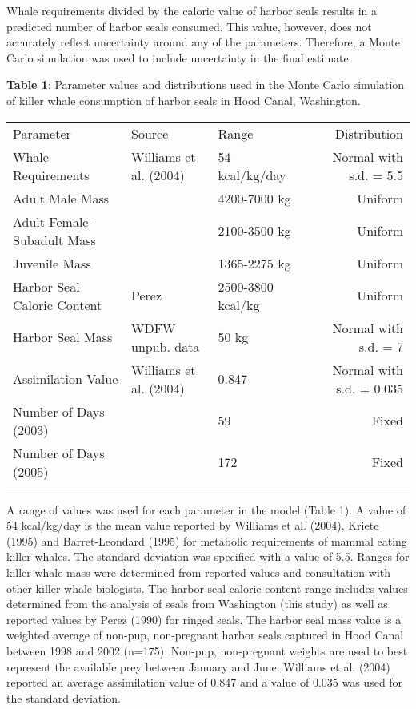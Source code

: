 Whale requirements divided by the caloric value of harbor seals results
in a predicted number of harbor seals consumed. This value, however,
does not accurately reflect uncertainty around any of the parameters.
Therefore, a Monte Carlo simulation was used to include uncertainty in
the final estimate.

\textbf{Table 1}: Parameter values and distributions used in the Monte
Carlo simulation of killer whale consumption of harbor seals in Hood
Canal, Washington.

\begin{longtable}[c]{@{}lllr@{}}
\hline\noalign{\medskip}
Parameter & Source & Range & Distribution
\\\noalign{\medskip}
\hline\noalign{\medskip}
Whale Requirements & Williams et al. (2004) & 54 kcal/kg/day & Normal
with s.d. = 5.5
\\\noalign{\medskip}
Adult Male Mass & & 4200-7000 kg & Uniform
\\\noalign{\medskip}
Adult Female-Subadult Mass & & 2100-3500 kg & Uniform
\\\noalign{\medskip}
Juvenile Mass & & 1365-2275 kg & Uniform
\\\noalign{\medskip}
Harbor Seal Caloric Content & Perez & 2500-3800 kcal/kg & Uniform
\\\noalign{\medskip}
Harbor Seal Mass & WDFW unpub. data & 50 kg & Normal with s.d. = 7
\\\noalign{\medskip}
Assimilation Value & Williams et al. (2004) & 0.847 & Normal with s.d. =
0.035
\\\noalign{\medskip}
Number of Days (2003) & & 59 & Fixed
\\\noalign{\medskip}
Number of Days (2005) & & 172 & Fixed
\\\noalign{\medskip}
\hline
\end{longtable}

A range of values was used for each parameter in the model (Table 1). A
value of 54 kcal/kg/day is the mean value reported by Williams et al.
(2004), Kriete (1995) and Barret-Leondard (1995) for metabolic
requirements of mammal eating killer whales. The standard deviation was
specified with a value of 5.5. Ranges for killer whale mass were
determined from reported values and consultation with other killer whale
biologists. The harbor seal caloric content range includes values
determined from the analysis of seals from Washington (this study) as
well as reported values by Perez (1990) for ringed seals. The harbor
seal mass value is a weighted average of non-pup, non-pregnant harbor
seals captured in Hood Canal between 1998 and 2002 (n=175). Non-pup,
non-pregnant weights are used to best represent the available prey
between January and June. Williams et al. (2004) reported an average
assimilation value of 0.847 and a value of 0.035 was used for the
standard deviation.


